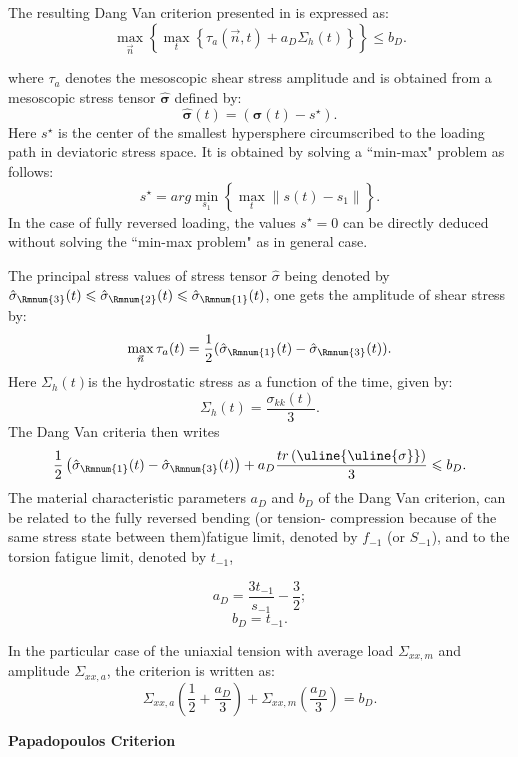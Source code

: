 The resulting Dang Van criterion presented in \cite{ballard1995high} is expressed as:
\begin{equation}
\max \limits_{\vec{n}}\left\lbrace \max \limits_{t}\left\{\tau_a{(\vec{n},t)}+a_D\Sigma_h(t)\right\}\right\rbrace \leqslant b_D.
\label{dv}
\end{equation}

where $\tau_a$ denotes the mesoscopic shear stress amplitude and is obtained from a mesoscopic stress tensor $\hat{\bm{\sigma}}$ defined by:
$$\hat{\bm{\sigma}}(t)=(\bm{\sigma}(t)-s^\star).$$
Here $s^\star$ is the center of the smallest hypersphere circumscribed to the loading path in deviatoric stress space. It is obtained by solving a ``min-max" problem as follows:
$$s^\star = arg \min\limits_{s_1}\left\{\max\limits_t\parallel s(t)-s_1\parallel\right\}.$$
In the case of fully reversed loading, the values $s^\star=0$ can be directly deduced without solving the ``min-max problem" as in general case.

The principal stress values of stress tensor $\hat{\sigma}$ being denoted by $\hat{\sigma}_{\Rmnum{3}}(t)\leqslant\hat{\sigma}_{\Rmnum{2}}(t)\leqslant\hat{\sigma}_{\Rmnum{1}}(t)$, one gets the amplitude of shear stress by:
$$\max \limits_{\vec{n}}\tau_a(t)=\frac{1}{2}(\hat{\sigma}_{\Rmnum{1}}(t)-\hat{\sigma}_{\Rmnum{3}}(t)).$$
Here $\Sigma_h(t)$is the hydrostatic stress as a function of the time, given by:$$\Sigma_h(t)=\frac{\sigma_{kk}(t)}{3}.$$
The Dang Van criteria then writes 
\begin{equation}
\frac{1}{2}\left( \hat{\sigma}_{\Rmnum{1}}(t)-\hat{\sigma}_{\Rmnum{3}}(t)\right) +a_D\dfrac{tr\left( \uline{\uline{\sigma}}\right) }{3}\leqslant b_D.
\end{equation}
The material characteristic parameters $a_D$ and $b_D$ of the Dang Van
criterion, can be related to the fully reversed bending (or tension-
compression because of the same stress state between them)fatigue limit, denoted by $f_{-1}$ (or $S_{-1}$), and to the torsion fatigue limit, denoted by $t_{-1}$,

$$a_D=\frac{3t_{-1}}{s_{-1}}-\frac{3}{2};$$  $$b_D=t_{-1}.$$

In the particular case of the uniaxial tension with average load $\Sigma_{xx,m}$ and amplitude $\Sigma_{xx,a}$, the criterion is written as:
$$\Sigma_{xx,a}\left(\dfrac{1}{2}+\dfrac{a_D}{3} \right)+\Sigma_{xx,m}\left(\dfrac{a_D}{3} \right) =b_D.$$

\textbf{Papadopoulos Criterion}

